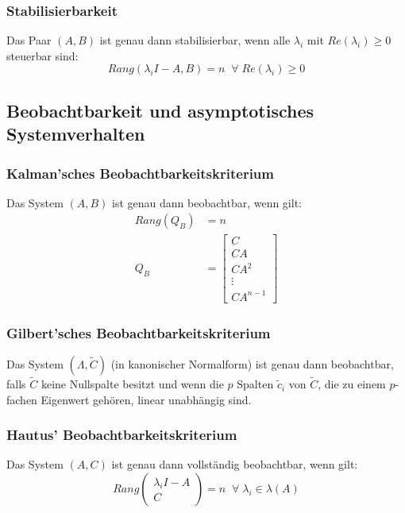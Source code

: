 \documentclass[a4paper,twocolumn,10pt]{article}
\begin{document}
\subsubsection{Stabilisierbarkeit}
Das Paar $(A,B)$ ist genau dann stabilisierbar, wenn alle $\lambda_i$ mit $Re(\lambda_i)\geq 0$ steuerbar sind:
\begin{equation*}
Rang(\lambda_i I-A,B)=n\;\;\forall\;Re(\lambda_i)\geq 0
\end{equation*}

\subsection{Beobachtbarkeit und asymptotisches Systemverhalten}
\subsubsection{Kalman'sches Beobachtbarkeitskriterium}
Das System $(A,B)$ ist genau dann beobachtbar, wenn gilt:
\begin{align*}
Rang(Q_B)&=n\\
Q_B&=\begin{bmatrix}C \\ CA \\ CA^2 \\ \vdots \\ CA^{n-1}\end{bmatrix}
\end{align*}

\subsubsection{Gilbert'sches Beobachtbarkeitskriterium}
Das System $(\Lambda,\tilde{C})$ (in kanonischer Normalform) ist genau dann beobachtbar, falls $\tilde{C}$ keine Nullspalte besitzt und wenn die $p$ Spalten $\tilde{c}_i$ von $\tilde{C}$, die zu einem $p$-fachen Eigenwert gehören, linear unabhängig sind.

\subsubsection{Hautus' Beobachtbarkeitskriterium}
Das System $(A,C)$ ist genau dann vollständig beobachtbar, wenn gilt:
\begin{equation*}
Rang\begin{pmatrix}\lambda_i I-A \\ C\end{pmatrix}=n\;\;\forall\;\lambda_i\in\lambda(A)
\end{equation*}
\end{document}
